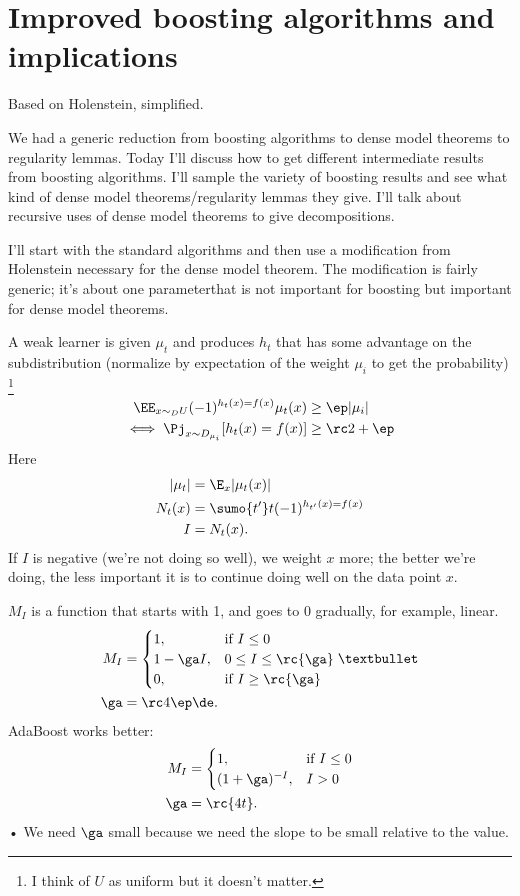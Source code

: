 \section{Improved boosting algorithms and implications}

Based on Holenstein, simplified.

We had a generic reduction from boosting algorithms to dense model theorems to regularity lemmas. Today I'll discuss how to get different intermediate results from boosting algorithms. I'll sample the variety of boosting results and see what kind of dense model theorems/regularity lemmas they give. I'll talk about recursive uses of dense model theorems to give decompositions.

I'll start with the standard algorithms and then use a modification from Holenstein necessary for the dense model theorem. The modification is fairly generic; it's about one parameterthat  is not important for boosting but important for dense model theorems.

A weak learner is given $\mu_t$ and produces $h_t$ that has some advantage on the subdistribution (normalize by expectation of the weight $\mu_i$ to get the probability)
\footnote{I think of $U$ as uniform but it doesn't matter.}
\begin{align}
\EE_{x\sim_D U} (-1)^{h_t(x) =f(x)} \mu_t(x) &\ge \ep |\mu_i|\\
\iff \Pj_{x\sim D_{\mu_i}} [h_t(x) = f(x)]&\ge \rc 2+\ep\end{align}
Here
\begin{align}
|\mu_t| &= \E_x|\mu_t(x)|\\
N_t(x) &=\sumo {t'}t  (-1)^{h_{t'}(x)=f(x)}\\
I&=N_t(x).
\end{align}
If $I$ is negative (we're not doing so well), we weight $x$ more; the better we're doing, the less important it is to continue doing well on the data point $x$.


$M_I$ is a function that starts with 1, and goes to 0 gradually, for example, linear.
\begin{align}
M_I &= \begin{cases}
1,&\text{if }I\le 0\\
1-\ga I, &0\le I \le \rc{\ga}\\
0,&\text{if }I\ge \rc{\ga}
\end{cases}•\\
\ga &= \rc 4 \ep \de.
\end{align}
AdaBoost works better:
\begin{align}
M_I &= \begin{cases}
1, &\text{if }I\le 0\\
(1+\ga)^{-I},&I>0
\end{cases}\\
\ga &= \rc{4t}.
\end{align}•
We need $\ga$ small because we need the slope to be small relative to the value.

